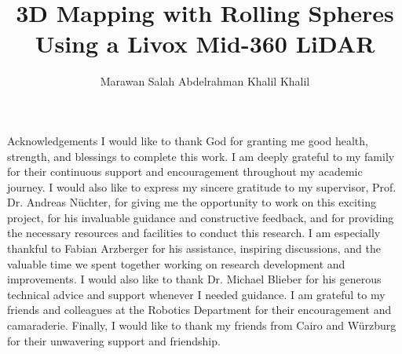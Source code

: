 \documentclass[english, bachelor, utf8]{base/thesis_telematics}
\begin{document}
\title{3D Mapping with Rolling Spheres Using a Livox Mid-360 LiDAR}
\author{Marawan Salah Abdelrahman Khalil Khalil}
\secondSupervisor{}

\generatetitle

\cleardoublepage    

\begin{prefacesection}{Acknowledgements}
I would like to thank God for granting me good health, strength, and blessings to complete this work.
I am deeply grateful to my family for their continuous support and encouragement throughout my academic journey.
I would also like to express my sincere gratitude to my supervisor, Prof. Dr. Andreas Nüchter, for giving me the opportunity to work on this exciting project, for his invaluable guidance and constructive feedback, and for providing the necessary resources and facilities to conduct this research.
I am especially thankful to Fabian Arzberger for his assistance, inspiring discussions, and the valuable time we spent together working on research development and improvements.
I would also like to thank Dr. Michael Blieber for his generous technical advice and support whenever I needed guidance.
I am grateful to my friends and colleagues at the Robotics Department for their encouragement and camaraderie.
Finally, I would like to thank my friends from Cairo and Würzburg for their unwavering support and friendship.
\end{prefacesection}

\newpage
\end{document}
